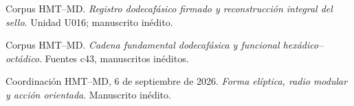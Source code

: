  Corpus HMT--MD. \emph{Registro dodecafásico firmado y reconstrucción integral del sello}.
Unidad U016; manuscrito inédito.

 Corpus HMT--MD. \emph{Cadena fundamental dodecafásica y funcional hexádico--octádico}.
Fuentes c43, manuscritos inéditos.

 Coordinación HMT--MD, 6 de septiembre de 2026.
\emph{Forma elíptica, radio modular y acción orientada}. Manuscrito inédito.
